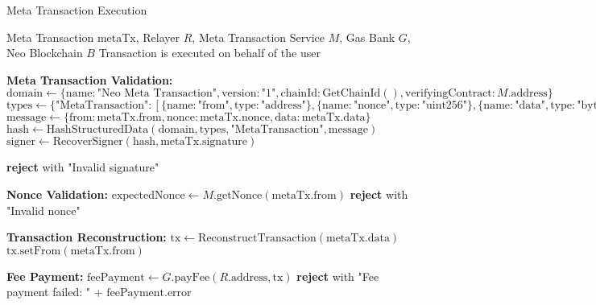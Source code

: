 \begin{tcolorbox}[
    enhanced,
    colback=blue!5!white,
    colframe=blue!75!black,
    arc=5mm,
    boxrule=1.5pt,
    title=Meta Transaction Execution Protocol,
    fonttitle=\bfseries,
    coltitle=white,
    attach boxed title to top left={yshift=-2mm, xshift=5mm},
    boxed title style={colback=blue!75!black, rounded corners},
    shadow={2mm}{-2mm}{0mm}{black!50},
    drop fuzzy shadow
]
\begin{protocol}{Meta Transaction Execution}
\label{prot:meta-tx-execution}
\begin{algorithmic}[1]
\Require Meta Transaction $\text{metaTx}$, Relayer $R$, Meta Transaction Service $M$, Gas Bank $G$, Neo Blockchain $B$
\Ensure Transaction is executed on behalf of the user

\State \textbf{Meta Transaction Validation:}
\State $\text{domain} \gets \{\text{name}: \text{"Neo Meta Transaction"}, \text{version}: \text{"1"}, \text{chainId}: \text{GetChainId}(), \text{verifyingContract}: M.\text{address}\}$
\State $\text{types} \gets \{\text{"MetaTransaction"}: [\{\text{name}: \text{"from"}, \text{type}: \text{"address"}\}, \{\text{name}: \text{"nonce"}, \text{type}: \text{"uint256"}\}, \{\text{name}: \text{"data"}, \text{type}: \text{"bytes"}\}]\}$
\State $\text{message} \gets \{\text{from}: \text{metaTx}.\text{from}, \text{nonce}: \text{metaTx}.\text{nonce}, \text{data}: \text{metaTx}.\text{data}\}$
\State $\text{hash} \gets \text{HashStructuredData}(\text{domain}, \text{types}, \text{"MetaTransaction"}, \text{message})$
\State $\text{signer} \gets \text{RecoverSigner}(\text{hash}, \text{metaTx}.\text{signature})$

    \State \textbf{reject} with "Invalid signature"
\EndIf

\State \textbf{Nonce Validation:}
\State $\text{expectedNonce} \gets M.\text{getNonce}(\text{metaTx}.\text{from})$
    \State \textbf{reject} with "Invalid nonce"
\EndIf

\State \textbf{Transaction Reconstruction:}
\State $\text{tx} \gets \text{ReconstructTransaction}(\text{metaTx}.\text{data})$
\State $\text{tx}.\text{setFrom}(\text{metaTx}.\text{from})$

\State \textbf{Fee Payment:}
\State $\text{feePayment} \gets G.\text{payFee}(R.\text{address}, \text{tx})$
    \State \textbf{reject} with "Fee payment failed: " + $\text{feePayment}.\text{error}$
\EndIf


\end{algorithmic}
\end{protocol}
\end{tcolorbox}
